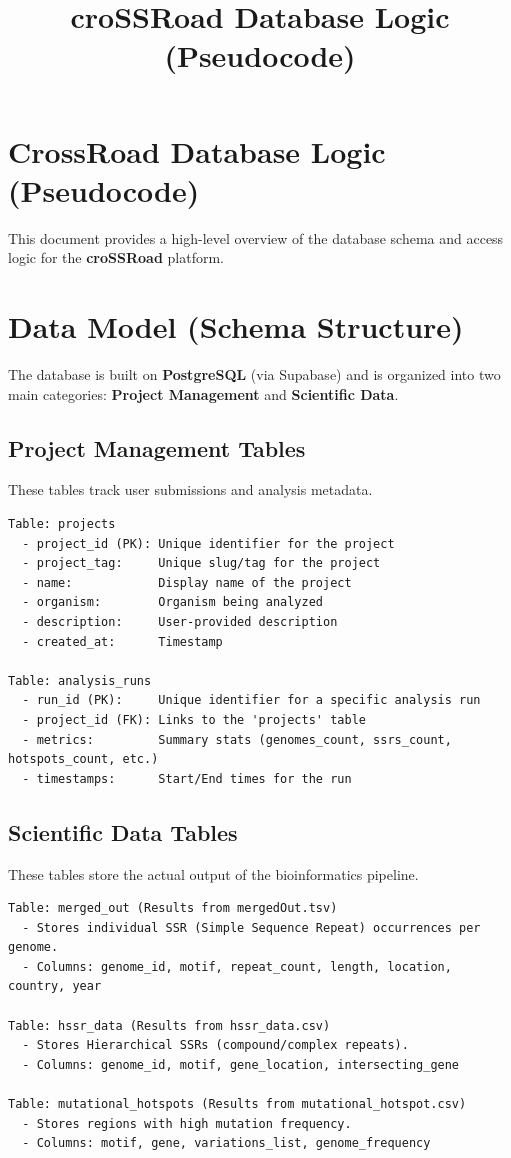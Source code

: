 \documentclass{article}
\title{croSSRoad Database Logic (Pseudocode)}
\author{}
\date{}
\begin{document}
\maketitle

\section*{CrossRoad Database Logic (Pseudocode)}

This document provides a high-level overview of the database schema and access logic for the \textbf{croSSRoad} platform.

\section{Data Model (Schema Structure)}

The database is built on \textbf{PostgreSQL} (via Supabase) and is organized into two main categories: \textbf{Project Management} and \textbf{Scientific Data}.

\subsection{Project Management Tables}
These tables track user submissions and analysis metadata.

\begin{lstlisting}[caption=Project Management Schema]
Table: projects
  - project_id (PK): Unique identifier for the project
  - project_tag:     Unique slug/tag for the project
  - name:            Display name of the project
  - organism:        Organism being analyzed
  - description:     User-provided description
  - created_at:      Timestamp

Table: analysis_runs
  - run_id (PK):     Unique identifier for a specific analysis run
  - project_id (FK): Links to the 'projects' table
  - metrics:         Summary stats (genomes_count, ssrs_count, hotspots_count, etc.)
  - timestamps:      Start/End times for the run
\end{lstlisting}

\subsection{Scientific Data Tables}
These tables store the actual output of the bioinformatics pipeline.

\begin{lstlisting}[caption=Scientific Data Schema]
Table: merged_out (Results from mergedOut.tsv)
  - Stores individual SSR (Simple Sequence Repeat) occurrences per genome.
  - Columns: genome_id, motif, repeat_count, length, location, country, year

Table: hssr_data (Results from hssr_data.csv)
  - Stores Hierarchical SSRs (compound/complex repeats).
  - Columns: genome_id, motif, gene_location, intersecting_gene

Table: mutational_hotspots (Results from mutational_hotspot.csv)
  - Stores regions with high mutation frequency.
  - Columns: motif, gene, variations_list, genome_frequency
\end{lstlisting}
\end{document}
